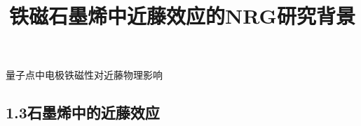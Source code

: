 \documentclass[9pt,t]{beamer} %
\begin{document}
\begin{frame}{量子点中电极铁磁性对近藤物理影响}
\begin{minipage}[t]{0.5 \textwidth}
\begin{figure}
\end{figure}
\vspace{-0.4cm}
\end{minipage}
\end{frame}
\subsection{1.3石墨烯中的近藤效应}
\title{铁磁石墨烯中近藤效应的NRG研究\qquad \qquad \qquad \qquad 背景}
\end{document}
